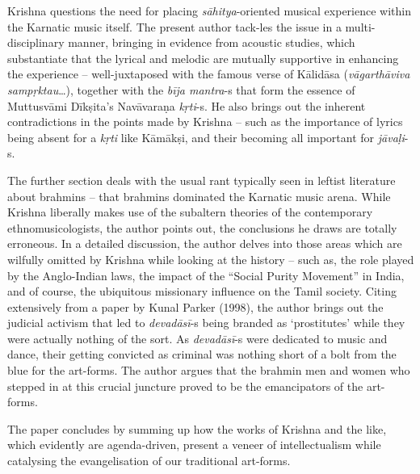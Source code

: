 Krishna questions the need for placing \textit{sāhitya}-oriented musical experience within the Karnatic music itself. The present author tack\break -les the issue in a multi-disciplinary manner, bringing in evidence from acoustic studies, which substantiate that the lyrical and melodic are mutually supportive in enhancing the experience – well-juxtaposed with the famous verse of Kālidāsa (\textit{vāgarthāviva sampṛktau}…), together with the \textit{bīja mantra}-s that form the essence of Muttusvāmi Dīkṣita’s Navāvaraṇa \textit{kṛti}-s. He also brings out the inherent contradictions in the points made by Krishna – such as the importance of lyrics being absent for a \textit{kṛti} like Kāmākṣi, and their becoming all important for \textit{jāvaḷi}-s.

The further section deals with the usual rant typically seen in leftist literature about brahmins – that brahmins dominated the Karnatic music arena. While Krishna liberally makes use of the subaltern theories of the contemporary ethnomusicologists, the author points out, the conclusions he draws are totally erroneous. In a detailed discussion, the author delves into those areas which are wilfully omitted by Krishna while looking at the history – such as, the role played by the Anglo-Indian laws, the impact of the “Social Purity Movement” in India, and of course, the ubiquitous missionary influence on the Tamil society. Citing extensively from a paper by Kunal Parker (1998), the author brings out the judicial activism that led to \textit{devadāsī}-s being branded as ‘prostitutes’ while they were actually nothing of the sort. As \textit{devadāsī}-s were dedicated to music and dance, their getting convicted as criminal was nothing short of a bolt from the blue for the art-forms. The author argues that the brahmin men and women who stepped in at this crucial juncture proved to be the emancipators of the art-forms.

The paper concludes by summing up how the works of Krishna and the like, which evidently are agenda-driven, present a veneer of intellectualism while catalysing the evangelisation of our traditional art-forms.

